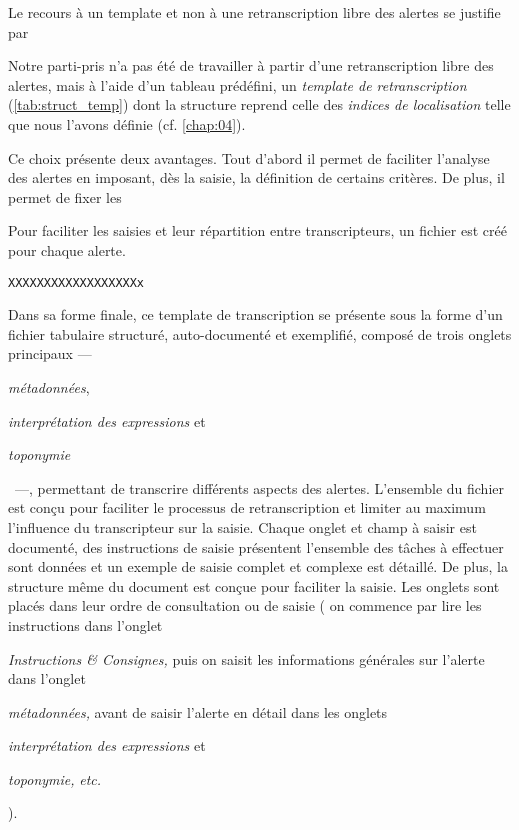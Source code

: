 Le recours à un template et non à une retranscription libre des
alertes se justifie par

Notre parti-pris n'a pas été de travailler à partir d'une
retranscription libre des alertes, mais à l'aide d'un tableau
prédéfini, un \emph{template de retranscription}
(\autoref{tab:struct_temp}) dont la structure reprend celle des
\emph{indices de localisation} telle que nous l'avons définie
(cf. \autoref{chap:04}).

Ce choix présente deux avantages. Tout d'abord il permet de faciliter
l'analyse des alertes en imposant, dès la saisie, la définition de
certains critères.
%
De plus, il permet de fixer les 



Pour faciliter les saisies et leur répartition entre transcripteurs,
un fichier est créé pour chaque alerte.

\texttt{XXXXXXXXXXXXXXXXXXx}


Dans sa forme finale, ce template de transcription se présente sous la
forme d'un fichier tabulaire structuré, auto-documenté et exemplifié,
composé de trois onglets principaux
%
---~\begin{enumerate*}[label=(\alph*)]
\item \emph{métadonnées},
\item \emph{interprétation des expressions} et
\item \emph{toponymie}
\end{enumerate*}~---,
%
permettant de transcrire différents aspects des alertes. L'ensemble du
fichier est conçu pour faciliter le processus de retranscription et
limiter au maximum l'influence du transcripteur sur la saisie. Chaque
onglet et champ à saisir est documenté, des instructions de saisie
présentent l'ensemble des tâches à effectuer sont données et un
exemple de saisie complet et complexe est détaillé. De plus, la
structure même du document est conçue pour faciliter la saisie. Les
onglets sont placés dans leur ordre de consultation ou de saisie (\eg
on commence par lire les instructions dans l'onglet
%
\begin{enumerate*}[label=(\arabic*)]
\item \emph{Instructions \& Consignes,} puis on saisit les
  informations générales sur l'alerte dans l'onglet
\item \emph{métadonnées,} avant de saisir l'alerte en détail dans les
  onglets
\item \emph{interprétation des expressions} et
\item \emph{toponymie,} \emph{etc.}
\end{enumerate*}).

